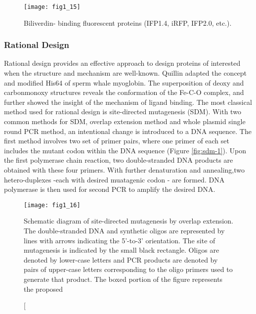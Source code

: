 \begin{refsection}
\begin{figure}[h!] \centering \texttt{[image: fig1\_15]}
    \caption[Biliverdin- binding fluorescent proteins (IFP1.4, iRFP, IFP2.0,
    etc.).]{Biliverdin- binding fluorescent proteins (IFP1.4, iRFP, IFP2.0,
        etc.)\cite{Kazlauskas2005}.} \label{fig:protein-engineering-example} 
\end{figure}

\subsubsection{Rational Design}
\label{sec:rational-design}

Rational design provides an effective approach to design proteins of interested
when the structure and mechanism are well-known. Quillin  adapted
the concept and modified His64 of sperm whale myoglobin. The superposition of
deoxy and carbonmonoxy structures reveals  the conformation of the Fe-C-O
complex, and further showed the insight of the mechanism of ligand
binding\cite{Quillin1993}. The most classical method used for rational design
is site-directed mutagenesis (SDM)\cite{Arnold1993}. With two common methods
for SDM, overlap extension method and whole plasmid single round PCR method, an
intentional change is introduced to a DNA sequence. The first method involves
two set of primer pairs, where one primer of each set includes the mutant codon
within the DNA sequence (Figure \ref{fig:sdm-1})\cite{Ho1989}. Upon the first
polymerase chain reaction, two double-stranded DNA products are obtained with
these four primers. With further denaturation and annealing,two hetero-duplexes
-each with desired muatagenic codon - are formed. DNA polymerase is then used
for second PCR to amplify the desired DNA\cite{Ho1989}. 
\begin{figure}[h!] \centering \texttt{[image: fig1\_16]}
    \caption[Schematic diagram of site-directed mutagenesis by overlap
        extension. The double-stranded DNA and synthetic oligos are represented
        by lines with arrows indicating the 5’-to-3’ orientation. The site of
        mutagenesis is indicated by the small black rectangle. Oligos are
        denoted by lower-case letters and PCR products are denoted by pairs of
        upper-case letters corresponding to the oligo primers used to generate
        that product. The boxed portion of the figure represents the proposed

\end{figure}
\end{refsection}
